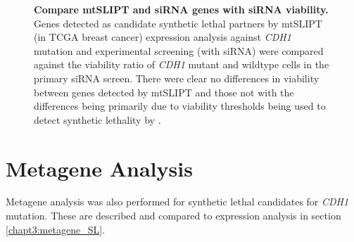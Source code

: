 \begin{figure}[!htp]
\begin{mdframed}
\begin{center}
   \end{center}
   \caption[Compare mtSLIPT and siRNA genes with siRNA viability]{\small \textbf{Compare mtSLIPT and siRNA genes with siRNA viability.}  Genes detected as candidate synthetic lethal partners by mtSLIPT (in TCGA breast cancer) expression analysis against \textit{CDH1} mutation and experimental screening (with siRNA) were compared against the viability ratio of \textit{CDH1} mutant and wildtype cells in the primary siRNA screen. There were clear no differences in viability between genes detected by mtSLIPT and those not with the differences being primarily due to viability thresholds being used to detect synthetic lethality by \citet{Telford2015}. 
}
\label{fig:compare_viability_mtSL}
\end{mdframed}
\end{figure}


\clearpage
\section{Metagene Analysis} \label{appendix:metagene_mtSL}

Metagene analysis was also performed for synthetic lethal candidates for \textit{CDH1} mutation. These are described and compared to expression analysis in section \ref{chapt3:metagene_SL}. 

